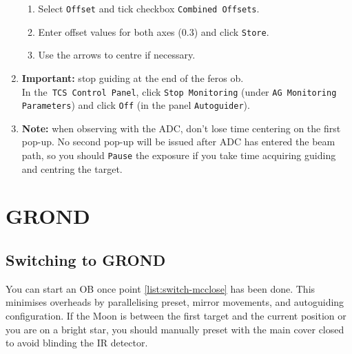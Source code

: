 \documentclass[11pt,fleqn]{book} %
\begin{document}
\begin{enumerate}
\begin{enumerate}
       \item Select \texttt{Offset} and tick checkbox \texttt{Combined Offsets}.
       \item Enter offset values for both axes (0.3) and click \texttt{Store}.
       \item Use the arrows to centre if necessary.  
    \end{enumerate}
  \item \textbf{Important:} stop guiding at the end of the \gls{feros} \gls{ob}.\\
  In the\texttt{ TCS Control Panel}, click \texttt{Stop Monitoring} (under \texttt{AG Monitoring Parameters}) and click \texttt{Off} (in the panel \texttt{Autoguider}).  
  \item \textbf{Note:} when observing with the ADC, don't lose time centering on the first pop-up.  No second
     pop-up will be issued after ADC has entered the beam path, so you should
     \texttt{Pause} the exposure if you take time acquiring guiding and centring
     the target.
\end{enumerate}

\section{GROND}

\subsection{Switching to GROND}

You can start an OB once point \ref{list:switch-mcclose} has been done.  This minimises overheads by parallelising preset, mirror movements, and autoguiding configuration.  If the Moon is between the first target and the current position or you are on a bright star, you should manually preset with the main cover closed to avoid blinding the IR detector.
\end{document}
